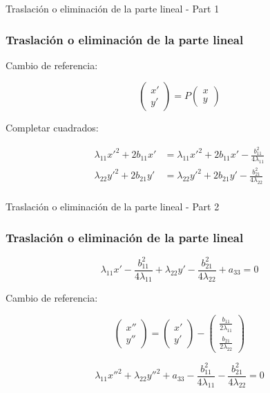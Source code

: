 \documentclass[xcolor={dvipsnames},aspectratio=169,10pt]{beamer}
\begin{document}
\begin{frame}{Traslación o eliminación de la parte lineal - Part 1}
  \frametitle{Traslación o eliminación de la parte lineal}

  Cambio de referencia:

  \begin{equation*}
    \begin{pmatrix} x' \\ y' \end{pmatrix} = P \begin{pmatrix} x \\ y \end{pmatrix}
  \end{equation*}

  Completar cuadrados:

  \begin{align*}
    \lambda_{11}x'^2 + 2b_{11}x' &= \lambda_{11}x'^2 + 2b_{11}x' - \frac{b_{11}^2}{4\lambda_{11}} \\
    \lambda_{22}y'^2 + 2b_{21}y' &= \lambda_{22}y'^2 + 2b_{21}y' - \frac{b_{21}^2}{4\lambda_{22}} \\
  \end{align*}
\end{frame}

\begin{frame}{Traslación o eliminación de la parte lineal - Part 2}
  \frametitle{Traslación o eliminación de la parte lineal}

  \begin{equation*}
    \lambda_{11}x' - \frac{b_{11}^2}{4\lambda_{11}} + \lambda_{22}y' - \frac{b_{21}^2}{4\lambda_{22}} + a_{33} = 0
  \end{equation*}

  Cambio de referencia:

  \begin{equation*}
    \begin{pmatrix} x'' \\ y'' \end{pmatrix} = \begin{pmatrix} x' \\ y' \end{pmatrix} - \begin{pmatrix} \frac{b_{11}}{2\lambda_{11}} \\ \frac{b_{21}}{2\lambda_{22}} \end{pmatrix}
  \end{equation*}

  \begin{equation*}
    \lambda_{11}x''^2 + \lambda_{22}y''^2 + a_{33} - \frac{b_{11}^2}{4\lambda_{11}} - \frac{b_{21}^2}{4\lambda_{22}} = 0
  \end{equation*}
\end{frame}
\end{document}

